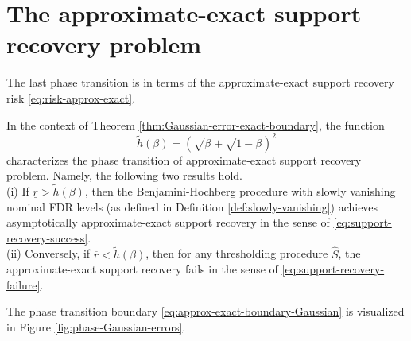 \section{The approximate-exact support recovery problem}
\label{subsec:aprox-exact-support-recovery-Gaussian}

The last phase transition is in terms of the approximate-exact support recovery risk
\eqref{eq:risk-approx-exact}.

\begin{theorem} \label{thm:Gaussian-error-approx-exact-boundary}
In the context of Theorem \ref{thm:Gaussian-error-exact-boundary}, the function 
\begin{equation} \label{eq:approx-exact-boundary-Gaussian}
    \widetilde{h}(\beta) = \left(\sqrt{\beta} + \sqrt{1-\beta}\right)^2
\end{equation}
characterizes the phase transition of approximate-exact support recovery problem.  Namely, the following two results 
hold.\\

{\rm (i)} If $\underline{r} > \widetilde{h}(\beta)$, then the Benjamini-Hochberg procedure with slowly vanishing nominal FDR levels (as defined in Definition \ref{def:slowly-vanishing}) achieves asymptotically approximate-exact support recovery in the sense of \eqref{eq:support-recovery-success}. \\

{\rm (ii)} Conversely, if $\overline{r} < \widetilde{h}(\beta)$, then for any thresholding procedure $\widehat{S}$, the approximate-exact support recovery fails in the sense of \eqref{eq:support-recovery-failure}.
\end{theorem}

The phase transition boundary \eqref{eq:approx-exact-boundary-Gaussian} is visualized in Figure \ref{fig:phase-Gaussian-errors}.

